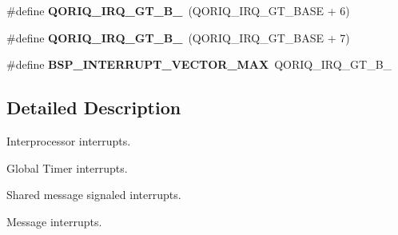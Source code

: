 \begin{DoxyCompactItemize}
\item 
\mbox{\label{group__QoriqInterruptIPI_ga1e397fcff1d2aa3aad458cb54cd5a187}} 
\#define {\bfseries Q\+O\+R\+I\+Q\+\_\+\+I\+R\+Q\+\_\+\+G\+T\+\_\+\+B\+\_}~(Q\+O\+R\+I\+Q\+\_\+\+I\+R\+Q\+\_\+\+G\+T\+\_\+\+B\+A\+SE + 6)
\item 
\mbox{\label{group__QoriqInterruptIPI_ga3562b6c73b35cc1e736534b772f59663}} 
\#define {\bfseries Q\+O\+R\+I\+Q\+\_\+\+I\+R\+Q\+\_\+\+G\+T\+\_\+\+B\+\_}~(Q\+O\+R\+I\+Q\+\_\+\+I\+R\+Q\+\_\+\+G\+T\+\_\+\+B\+A\+SE + 7)
\item 
\mbox{\label{group__QoriqInterruptIPI_gae4a2cdda5816a4c83c2fac0a49880c6e}} 
\#define {\bfseries B\+S\+P\+\_\+\+I\+N\+T\+E\+R\+R\+U\+P\+T\+\_\+\+V\+E\+C\+T\+O\+R\+\_\+\+M\+AX}~Q\+O\+R\+I\+Q\+\_\+\+I\+R\+Q\+\_\+\+G\+T\+\_\+\+B\+\_
\end{DoxyCompactItemize}


\subsection{Detailed Description}
Interprocessor interrupts. 

Global Timer interrupts.

Shared message signaled interrupts.

Message interrupts.
